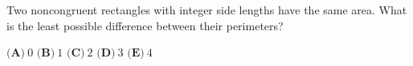 Two noncongruent rectangles with integer side lengths have the same area. What is the least possible difference between their perimeters?

$\textbf{(A)}\ 0$ \qquad $\textbf{(B)}\ 1$ \qquad $\textbf{(C)}\ 2$ \qquad $\textbf{(D)}\ 3$ \qquad $\textbf{(E)}\ 4$
